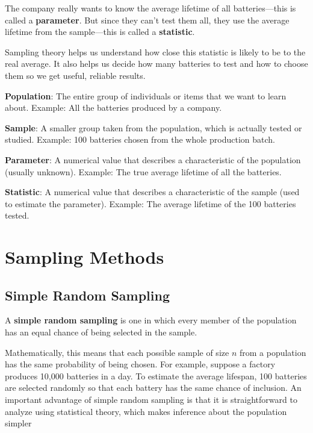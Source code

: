 \documentclass[twoside]{book}
\begin{document}
The company really wants to know the average lifetime of all batteries—this is called a \textbf{parameter}. But since they can’t test them all, they use the average lifetime from the sample—this is called a \textbf{statistic}. 

Sampling theory helps us understand how close this statistic is likely to be to the real average. It also helps us decide how many batteries to test and how to choose them so we get useful, reliable results.

\begin{textbox}
    \textbf{Population}: The entire group of individuals or items that we want to learn about.
    Example: All the batteries produced by a company.
    
    \vspace{3mm}
    \textbf{Sample}: A smaller group taken from the population, which is actually tested or studied.
    Example: 100 batteries chosen from the whole production batch.
    
    \vspace{3mm}
    \textbf{Parameter}: A numerical value that describes a characteristic of the population (usually unknown).
    Example: The true average lifetime of all the batteries.
    
    \vspace{3mm}
    \textbf{Statistic}: A numerical value that describes a characteristic of the sample (used to estimate the parameter).
    Example: The average lifetime of the 100 batteries tested.
\end{textbox}

\section{Sampling Methods}

\subsection{Simple Random Sampling}

\begin{textbox}
A \textbf{simple random sampling} is one in which every member of the population has an equal chance of being selected in the sample.
\end{textbox}
 Mathematically, this means that each possible sample of size $n$ from a population has the same probability of being chosen. For example, suppose a factory produces 10,000 batteries in a day. To estimate the average lifespan, 100 batteries are selected randomly so that each battery has the same chance of inclusion. An important advantage of simple random sampling is that it is straightforward to analyze using statistical theory, which makes inference about the population simpler
\end{document}
